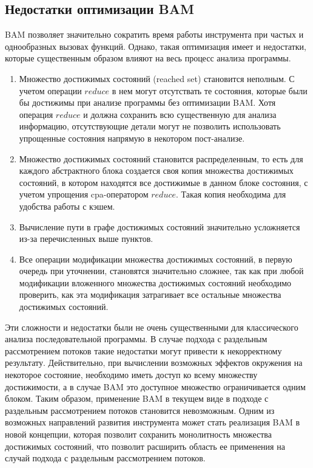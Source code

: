 \subsection{Недостатки оптимизации BAM}

BAM позволяет значительно сократить время работы инструмента при частых и однообразных вызовах функций.
Однако, такая оптимизация имеет и недостатки, которые существенным образом влияют на весь процесс анализа программы.
\begin{enumerate}
\item Множество достижимых состояний (reached set) становится неполным.
С учетом операции $reduce$ в нем могут отсутствать те состояния, которые были бы достижимы при анализе программы без оптимизации BAM.
Хотя операция $reduce$ и должна сохранить всю существенную для анализа информацию, отсутствующие детали могут не позволить использовать упрощенные состояния напрямую в некотором пост-анализе.
\item Множество достижимых состояний становится распределенным, то есть для каждого абстрактного блока создается своя копия множества достижимых состояний, в котором находятся все достижимые в данном блоке состояния, с учетом упрощения cpa-оператором $reduce$.
Такая копия необходима для удобства работы с кэшем.
\item Вычисление пути в графе достижимых состояний значительно усложняется из-за перечисленных выше пунктов. 
\item Все операции модификации множества достижимых состояний, в первую очередь при уточнении, становятся значительно сложнее, так как при любой модификации вложенного множества достижимых состояний необходимо проверить, как эта модификация затрагивает все остальные множества достижимых состояний.
\end{enumerate}

Эти сложности и недостатки были не очень существенными для классического анализа последовательной программы.
В случае подхода с раздельным рассмотрением потоков такие недостатки могут привести к некорректному результату.
Действительно, при вычислении возможных эффектов окружения на некоторое состояние, необходимо иметь доступ ко всему множеству достижимости, а в случае BAM это доступное множество ограничивается одним блоком.
Таким образом, применение BAM в текущем виде в подходе с раздельным рассмотрением потоков становится невозможным.
Одним из возможных направлений развития инструмента может стать реализация BAM в новой концепции, которая позволит сохранить монолитность множества достижимых состояний, что позволит расширить область ее применения на случай подхода с раздельным рассмотрением потоков.

